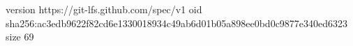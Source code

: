 version https://git-lfs.github.com/spec/v1
oid sha256:ac3edb9622f82cd6e1330018934c49ab6d01b05a898ee0bd0c9877e340ed6323
size 69
